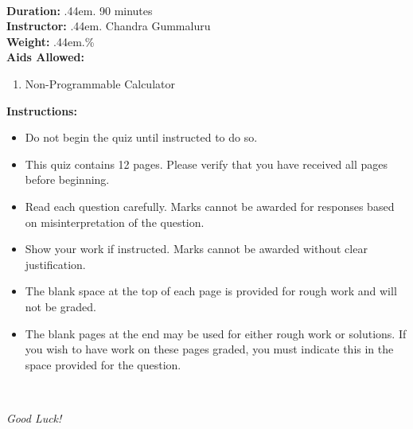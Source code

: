 \documentclass[12pt]{article}
\makeatletter
\newcommand\cdotfill{%
    \leavevmode\cleaders\hb@xt@.44em{\hss$.$\hss}\hfill\kern\z@
}
\makeatother
\begin{document}
\begin{minipage}{0.6\textwidth}
\begin{tabular}{|c|c|c|c|c|c|c|c|c|c|}
  \hspace{1.2em}\; & \hspace{1.2em}\; & \hspace{1.2em}\; & \hspace{1.2em}\; & \hspace{1.2em}\; & \hspace{1.2em}\; & \hspace{1.2em}\; & \hspace{1.2em}\; & \hspace{1.2em}\; & \hspace{1.2em}\;\\
  \hline
\end{tabular}
\end{minipage}
\\[0.75cm]
\noindent \textbf{Duration:}\cdotfill {90 minutes}\\
\textbf{Instructor:}\cdotfill Chandra Gummaluru\\
\textbf{Weight:}\cdotfill 15\% \\
\textbf{Aids Allowed:}
\begin{enumerate}
    \item[(1)] Non-Programmable Calculator
\end{enumerate}
\textbf{Instructions:}
\begin{itemize}
    \item Do not begin the quiz until instructed to do so.
    \item This quiz contains 12 pages. Please verify that you have received all pages before beginning.
    \item Read each question carefully. Marks cannot be awarded for responses based on misinterpretation of the question.
    \item Show your work if instructed. Marks cannot be awarded without clear justification.
    \item The blank space at the top of each page is provided for rough work and will not be graded.
    \item The blank pages at the end may be used for either rough work or solutions. If you wish to have work on these pages graded, you must indicate this in the space provided for the question.
\end{itemize}
\\[0.25cm]
\begin{center}
    \textit{Good Luck!}
\end{center}

\clearpage

\end{document}
